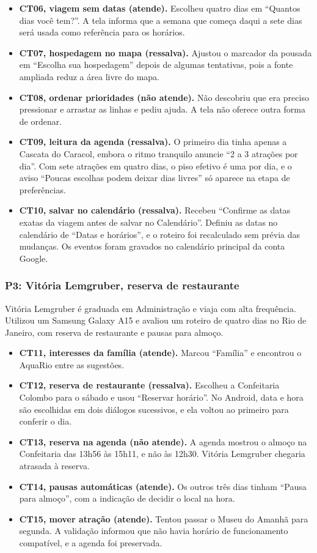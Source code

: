 \begin{itemize}
  \item \textbf{CT06, viagem sem datas (atende).} Escolheu quatro dias em ``Quantos dias você tem?''. A tela informa que a semana que começa daqui a sete dias será usada como referência para os horários.
  \item \textbf{CT07, hospedagem no mapa (ressalva).} Ajustou o marcador da pousada em ``Escolha sua hospedagem'' depois de algumas tentativas, pois a fonte ampliada reduz a área livre do mapa.
  \item \textbf{CT08, ordenar prioridades (não atende).} Não descobriu que era preciso pressionar e arrastar as linhas e pediu ajuda. A tela não oferece outra forma de ordenar.
  \item \textbf{CT09, leitura da agenda (ressalva).} O primeiro dia tinha apenas a Cascata do Caracol, embora o ritmo tranquilo anuncie ``2 a 3 atrações por dia''. Com sete atrações em quatro dias, o piso efetivo é uma por dia, e o aviso ``Poucas escolhas podem deixar dias livres'' só aparece na etapa de preferências.
  \item \textbf{CT10, salvar no calendário (ressalva).} Recebeu ``Confirme as datas exatas da viagem antes de salvar no Calendário''. Definiu as datas no calendário de ``Datas e horários'', e o roteiro foi recalculado sem prévia das mudanças. Os eventos foram gravados no calendário principal da conta Google.
\end{itemize}

\subsubsection{P3: Vitória Lemgruber, reserva de restaurante}

Vitória Lemgruber é graduada em Administração e viaja com alta frequência. Utilizou um Samsung Galaxy A15 e avaliou um roteiro de quatro dias no Rio de Janeiro, com reserva de restaurante e pausas para almoço.

\begin{itemize}
  \item \textbf{CT11, interesses da família (atende).} Marcou ``Família'' e encontrou o AquaRio entre as sugestões.
  \item \textbf{CT12, reserva de restaurante (ressalva).} Escolheu a Confeitaria Colombo para o sábado e usou ``Reservar horário''. No Android, data e hora são escolhidas em dois diálogos sucessivos, e ela voltou ao primeiro para conferir o dia.
  \item \textbf{CT13, reserva na agenda (não atende).} A agenda mostrou o almoço na Confeitaria das 13h56 às 15h11, e não às 12h30. Vitória Lemgruber chegaria atrasada à reserva.
  \item \textbf{CT14, pausas automáticas (atende).} Os outros três dias tinham ``Pausa para almoço'', com a indicação de decidir o local na hora.
  \item \textbf{CT15, mover atração (atende).} Tentou passar o Museu do Amanhã para segunda. A validação informou que não havia horário de funcionamento compatível, e a agenda foi preservada.
\end{itemize}


